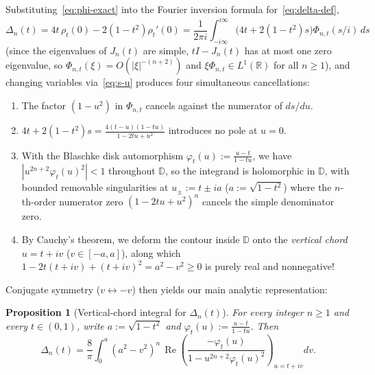 \documentclass[11pt,a4paper]{article}
\newcommand{\R}{\mathbb{R}}
\newcommand{\D}{\mathbb{D}}
\newcommand{\RePart}{\operatorname{Re}}
\newtheorem{proposition}{Proposition}[section]
\theoremstyle{remark}
\numberwithin{equation}{section}
\begin{document}
Substituting~\eqref{eq:phi-exact} into the Fourier inversion formula for~\eqref{eq:delta-def},
\[
    \Delta_n(t) = 4t\,\rho_t(0) - 2(1 - t^2)\rho_t'(0)
    = \frac{1}{2\pi i}\int_{-i\infty}^{i\infty}\bigl(4t + 2(1 - t^2)s\bigr)\Phi_{n,t}(s/i)\,ds
\]
(since the eigenvalues of $J_n(t)$ are simple, $tI - J_n(t)$ has at most one zero eigenvalue, so $\Phi_{n,t}(\xi) = O(|\xi|^{-(n+2)})$ and $\xi\Phi_{n,t} \in L^1(\R)$ for all $n \ge 1$), and changing variables via~\eqref{eq:s-u} produces four simultaneous cancellations:
\begin{enumerate}[label=\textup{(\arabic*)}]
    \item The factor $(1 - u^2)$ in $\Phi_{n,t}$ cancels against the numerator of $ds/du$.
    \item $4t + 2(1 - t^2)s = \frac{4(t - u)(1 - tu)}{1 - 2tu + u^2}$ introduces no pole at $u = 0$.
    \item With the Blaschke disk automorphism $\varphi_t(u) := \frac{u - t}{1 - tu}$, we have $|u^{2n+2}\varphi_t(u)^2| < 1$ throughout $\D$, so the integrand is holomorphic in $\D$, with bounded removable singularities at $u_\pm := t \pm ia$ ($a := \sqrt{1 - t^2}$) where the $n$-th-order numerator zero $(1 - 2tu + u^2)^n$ cancels the simple denominator zero.
    \item By Cauchy's theorem, we deform the contour inside $\D$ onto the \emph{vertical chord} $u = t + iv$ ($v \in [-a, a]$), along which $1 - 2t(t + iv) + (t + iv)^2 = a^2 - v^2 \ge 0$ is purely real and nonnegative!
\end{enumerate}

Conjugate symmetry ($v \leftrightarrow -v$) then yields our main analytic representation:

\begin{proposition}[Vertical-chord integral for $\Delta_n(t)$]
    \label{prop:chord}
    For every integer $n \ge 1$ and every $t \in (0,1)$, write $a := \sqrt{1 - t^2}$ and $\varphi_t(u) := \frac{u - t}{1 - tu}$. Then
    \begin{equation}
        \Delta_n(t)
        = \frac{8}{\pi}\int_0^a (a^2 - v^2)^n\,
          \RePart\!\left(\frac{-\varphi_t(u)}{1 - u^{2n+2}\varphi_t(u)^2}\right)_{u = t + iv} dv.
        \label{eq:delta-chord}
    \end{equation}
\end{proposition}
\end{document}

